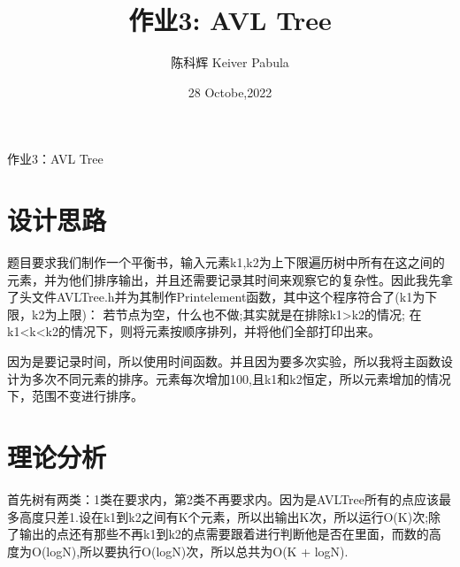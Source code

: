 \documentclass{ctexart}
\title{作业3: AVL Tree}
\author{陈科辉 Keiver Pabula}
\date{28 Octobe,2022}
\begin{document}
\maketitle

作业3：AVL Tree
\section{设计思路}
题目要求我们制作一个平衡书，输入元素k1,k2为上下限遍历树中所有在这之间的元素，并为他们排序输出，并且还需要记录其时间来观察它的复杂性。因此我先拿了头文件AVLTree.h并为其制作Printelement函数，其中这个程序符合了(k1为下限，k2为上限)：
若节点为空，什么也不做;其实就是在排除k1>k2的情况;
在k1<k<k2的情况下，则将元素按顺序排列，并将他们全部打印出来。

  因为是要记录时间，所以使用时间函数。并且因为要多次实验，所以我将主函数设计为多次不同元素的排序。元素每次增加100,且k1和k2恒定，所以元素增加的情况下，范围不变进行排序。
\section{理论分析}
  首先树有两类：1类在要求内，第2类不再要求内。因为是AVLTree所有的点应该最多高度只差1.设在k1到k2之间有K个元素，所以出输出K次，所以运行O(K)次;除了输出的点还有那些不再k1到k2的点需要跟着进行判断他是否在里面，而数的高度为O(logN),所以要执行O(logN)次，所以总共为O(K + logN).
\end{document}
